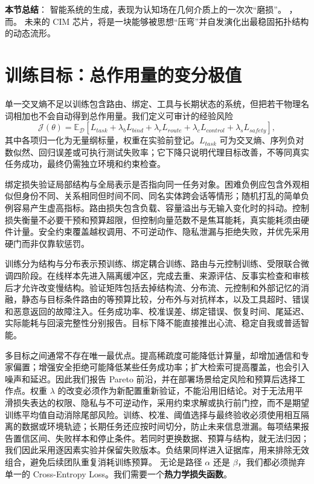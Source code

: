 \textbf{本节总结}：
智能系统的生成，表现为认知场在几何介质上的一次次“磨损”。
，而。
未来的 CIM 芯片，将是一块能够被思想“压弯”并自发演化出最稳固拓扑结构的动态流形。



\section{训练目标：总作用量的变分极值}
\label{sec:section_2293}
单一交叉熵不足以训练包含路由、绑定、工具与长期状态的系统，但把若干物理名词相加也不会自动得到总作用量。我们定义可审计的经验风险
\begin{equation}
\mathcal{J}(\theta)=\mathbb{E}_{\mathcal D}[L_{task}+\lambda_bL_{bind}
+\lambda_rL_{route}+\lambda_cL_{control}+\lambda_sL_{safety}],
\end{equation}
其中各项归一化为无量纲标量，权重在实验前登记。$L_{task}$ 可为交叉熵、序列负对数似然、回归误差或可执行测试失败率；它下降只说明代理目标改善，不等同真实任务成功，最终仍需独立环境和约束检查。

绑定损失验证局部结构与全局表示是否指向同一任务对象。困难负例应包含外观相似但身份不同、关系相同但时间不同、同名实体跨会话等情形；随机打乱的简单负例容易产生虚高指标。路由损失包含负载、容量溢出与无输入变化时的抖动。控制损失衡量不必要干预和预算超限，但控制向量范数不是焦耳能耗，真实能耗须由硬件计量。安全约束覆盖越权调用、不可逆动作、隐私泄漏与拒绝失败，并优先采用硬门而非仅靠软惩罚。

训练分为结构与分布表示预训练、绑定耦合训练、路由与元控制训练、受限联合微调四阶段。在线样本先进入隔离缓冲区，完成去重、来源评估、反事实检查和审核后才允许改变慢结构。验证矩阵包括去掉结构流、分布流、元控制和外部记忆的消融，静态与目标条件路由的等预算比较，分布外与对抗样本，以及工具超时、错误和恶意返回的故障注入。任务成功率、校准误差、绑定错误、恢复时间、尾延迟、实际能耗与回滚完整性分别报告。目标下降不能直接推出心流、稳定自我或普适智能。

多目标之间通常不存在唯一最优点。提高稀疏度可能降低计算量，却增加通信和专家偏置；增强安全拒绝可能降低某些任务成功率；扩大检索可提高覆盖，也会引入噪声和延迟。因此我们报告 Pareto 前沿，并在部署场景给定风险和预算后选择工作点。权重 $\lambda$ 的改变必须作为新配置重新验证，不能沿用旧结论。对于无法用平滑损失表达的权限、隐私与不可逆动作，采用约束求解或执行前门控，而不是期望训练平均值自动消除尾部风险。训练、校准、阈值选择与最终验收必须使用相互隔离的数据或环境轨迹；长期任务还应按时间切分，防止未来信息泄漏。每项结果报告置信区间、失败样本和停止条件。若同时更换数据、预算与结构，就无法归因；我们因此采用逐因素实验并保留失败版本。负结果同样进入证据库，用来排除无效组合，避免后续团队重复消耗训练预算。
无论是路径 $\alpha$ 还是 $\beta$，我们都必须抛弃单一的 Cross-Entropy Loss。我们需要一个\textbf{热力学损失函数}。

